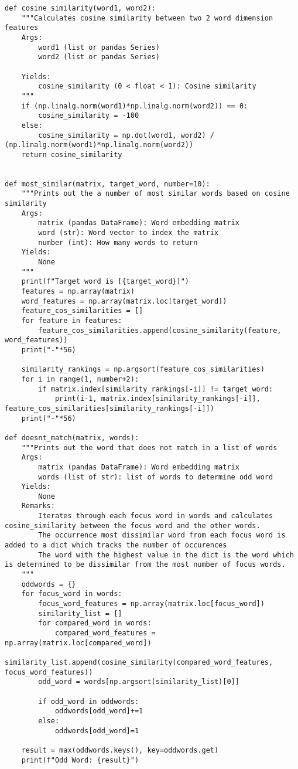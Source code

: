 \documentclass[12pt, letterpaper]{article}
\begin{document}
\begin{mdframed}[backgroundcolor=shadecolor]
\begin{verbatim}
def cosine_similarity(word1, word2):
    """Calculates cosine similarity between two 2 word dimension features
    Args:
        word1 (list or pandas Series)
        word2 (list or pandas Series)

    Yields:
        cosine_similarity (0 < float < 1): Cosine similarity
    """
    if (np.linalg.norm(word1)*np.linalg.norm(word2)) == 0:
        cosine_similarity = -100
    else:
        cosine_similarity = np.dot(word1, word2) / (np.linalg.norm(word1)*np.linalg.norm(word2))
    return cosine_similarity


def most_similar(matrix, target_word, number=10):
    """Prints out the a number of most similar words based on cosine similarity
    Args:
        matrix (pandas DataFrame): Word embedding matrix
        word (str): Word vector to index the matrix
        number (int): How many words to return
    Yields:
        None 
    """
    print(f"Target word is [{target_word}]")
    features = np.array(matrix)
    word_features = np.array(matrix.loc[target_word])
    feature_cos_similarities = []
    for feature in features:
        feature_cos_similarities.append(cosine_similarity(feature, word_features))
    print("-"*56)
    
    similarity_rankings = np.argsort(feature_cos_similarities)
    for i in range(1, number+2):
        if matrix.index[similarity_rankings[-i]] != target_word:
            print(i-1, matrix.index[similarity_rankings[-i]], feature_cos_similarities[similarity_rankings[-i]])
    print("-"*56)
    
def doesnt_match(matrix, words):
    """Prints out the word that does not match in a list of words
    Args:
        matrix (pandas DataFrame): Word embedding matrix
        words (list of str): list of words to determine odd word
    Yields:
        None
    Remarks:
        Iterates through each focus word in words and calculates cosine_similarity between the focus word and the other words.
        The occurrence most dissimilar word from each focus word is added to a dict which tracks the number of occurences
        The word with the highest value in the dict is the word which is determined to be dissimilar from the most number of focus words.
    """
    oddwords = {}
    for focus_word in words:
        focus_word_features = np.array(matrix.loc[focus_word])
        similarity_list = []
        for compared_word in words:
            compared_word_features = np.array(matrix.loc[compared_word])
            similarity_list.append(cosine_similarity(compared_word_features, focus_word_features))
        odd_word = words[np.argsort(similarity_list)[0]]

        if odd_word in oddwords:
            oddwords[odd_word]+=1
        else:
            oddwords[odd_word]=1
    
    result = max(oddwords.keys(), key=oddwords.get)
    print(f"Odd Word: {result}")
\end{verbatim}
\end{mdframed}
\end{document}
